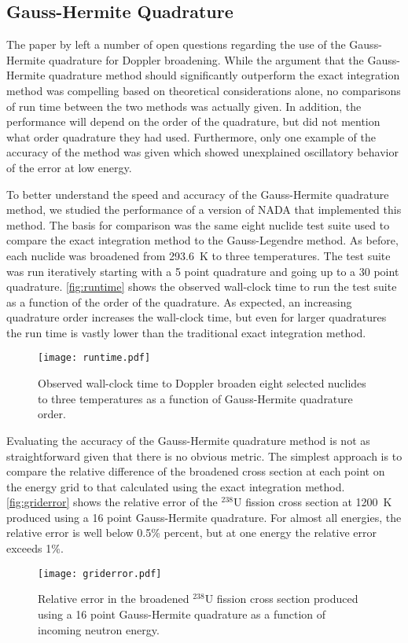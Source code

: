 \documentclass[3p,authoryear]{elsarticle}
\begin{document}
\subsection{Gauss-Hermite Quadrature}

The paper by \citet{nd-dean-2010} left a number of open questions regarding the
use of the Gauss-Hermite quadrature for Doppler broadening. While the argument
that the Gauss-Hermite quadrature method should significantly outperform the
exact integration method was compelling based on theoretical considerations
alone, no comparisons of run time between the two methods was actually given. In
addition, the performance will depend on the order of the quadrature, but
\citet{nd-dean-2010} did not mention what order quadrature they had
used. Furthermore, only one example of the accuracy of the method was given
which showed unexplained oscillatory behavior of the error at low energy.

To better understand the speed and accuracy of the Gauss-Hermite quadrature
method, we studied the performance of a version of NADA that implemented this
method. The basis for comparison was the same eight nuclide test suite used to
compare the exact integration method to the Gauss-Legendre method. As before,
each nuclide was broadened from \SI{293.6}{\kelvin} to three temperatures. The
test suite was run iteratively starting with a 5 point quadrature and going up
to a 30 point quadrature. \autoref{fig:runtime} shows the observed wall-clock
time to run the test suite as a function of the order of the quadrature. As
expected, an increasing quadrature order increases the wall-clock time, but even
for larger quadratures the run time is vastly lower than the traditional exact
integration method.

\begin{figure}[H]
  \centering
  \texttt{[image: runtime.pdf]}
  \caption{Observed wall-clock time to Doppler broaden eight selected nuclides
    to three temperatures as a function of Gauss-Hermite quadrature order.}
  \label{fig:runtime}
\end{figure}

Evaluating the accuracy of the Gauss-Hermite quadrature method is not as
straightforward given that there is no obvious metric. The simplest approach is
to compare the relative difference of the broadened cross section at each point
on the energy grid to that calculated using the exact integration
method. \autoref{fig:griderror} shows the relative error of the $^{238}$U
fission cross section at \SI{1200}{\kelvin} produced using a 16 point
Gauss-Hermite quadrature. For almost all energies, the relative error is well
below 0.5\% percent, but at one energy the relative error exceeds 1\%.
\begin{figure}[H]
  \centering
  \texttt{[image: griderror.pdf]}
  \caption{Relative error in the broadened $^{238}$U fission cross section
    produced using a 16 point Gauss-Hermite quadrature as a function of incoming
    neutron energy.}
  \label{fig:griderror}
\end{figure}
\end{document}

